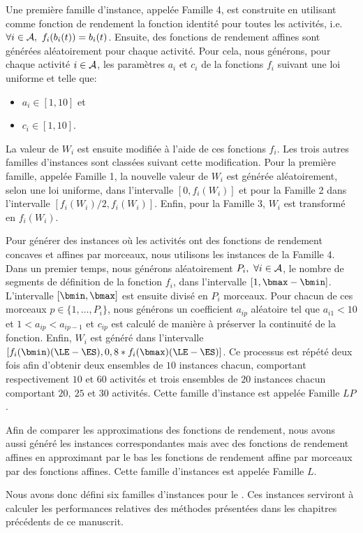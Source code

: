 Une première famille d'instance, appelée Famille 4, est construite en
utilisant comme fonction de rendement la fonction identité pour toutes
les activités, i.e. $\forall i \in \A,\ f_i(b_i(t))= b_i(t)$. Ensuite,
des fonctions de rendement affines sont générées aléatoirement pour
chaque activité. Pour cela, nous générons, pour chaque activité $i \in
{\cal A}$, les paramètres $a_i$ et $c_i$ de la fonctions $f_i$ suivant une
loi uniforme et telle que:
\begin{itemize}
\item $a_i \in [1,10]$ et
\item $c_i \in [1,10]$.
\end{itemize} La valeur de $W_i$ est ensuite modifiée à l'aide de ces
fonctions $f_i$. Les trois autres familles d'instances sont classées
suivant cette modification. Pour la première famille, appelée Famille
1, la nouvelle valeur de $W_i$ est générée aléatoirement, selon une
loi uniforme, dans l'intervalle $[0,f_i(W_i)]$ et pour la Famille 2
dans l'intervalle $[f_i(W_i)/2, f_i(W_i)]$. Enfin, pour la Famille 3,
$W_i$ est transformé en $f_i(W_i)$. 

Pour générer des instances où les activités ont des fonctions de
rendement concaves et affines par morceaux, nous utilisons les
instances de la Famille 4. Dans un premier temps, nous générons
aléatoirement $P_i,\ \forall i \in {\cal A}$, le nombre de segments de
définition de la fonction $f_i$, dans l'intervalle $[1 ,\bmax -
\bmin]$. L'intervalle $[\bmin,\bmax]$ est ensuite divisé en $P_i$
morceaux. Pour chacun de ces morceaux $ p \in \{1,\dots,P_i\}$, nous
générons un coefficient $a_{ip}$ aléatoire tel que $a_{i1}<10$ et $1 <
a_{ip} < a_{ip-1}$ et $c_{ip}$ est calculé de manière à préserver la
continuité de la fonction. Enfin, $W_i$ est généré dans l'intervalle
$[f_i(\bmin)(\LE-\ES), 0,8*f_i(\bmax)(\LE-\ES)]$. Ce processus est
répété deux fois afin d'obtenir deux ensembles de $10$ instances
chacun, comportant respectivement $10$ et $60$ activités et trois
ensembles de $20$ instances chacun comportant $20,\ 25$ et $30$
activités. Cette famille d'instance est appelée Famille $LP$.
 
Afin de comparer les approximations des fonctions de rendement, nous
avons aussi généré les instances correspondantes mais avec des
fonctions de rendement affines en approximant par le bas les fonctions de
rendement affine par morceaux par des fonctions affines. Cette famille
d'instances est appelée Famille $L$. 

Nous avons donc défini six familles d'instances pour le \CECSP. Ces
instances serviront à calculer les performances relatives des méthodes
présentées dans les chapitres précédents de ce manuscrit. 

